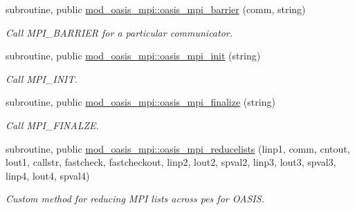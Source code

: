 \begin{DoxyCompactItemize}
subroutine, public \hyperlink{namespacemod__oasis__mpi_aaf477847380fbbbc1341520b0b3e66da}{mod\+\_\+oasis\+\_\+mpi\+::oasis\+\_\+mpi\+\_\+barrier} (comm, string)
\begin{DoxyCompactList}\small\item\em Call M\+P\+I\+\_\+\+B\+A\+R\+R\+I\+ER for a particular communicator. \end{DoxyCompactList}\item 
subroutine, public \hyperlink{namespacemod__oasis__mpi_aaf45f20e0000b32e71ec9ea8e806f57c}{mod\+\_\+oasis\+\_\+mpi\+::oasis\+\_\+mpi\+\_\+init} (string)
\begin{DoxyCompactList}\small\item\em Call M\+P\+I\+\_\+\+I\+N\+IT. \end{DoxyCompactList}\item 
subroutine, public \hyperlink{namespacemod__oasis__mpi_a0a601a3f718c0704db99a21b2c43fbcd}{mod\+\_\+oasis\+\_\+mpi\+::oasis\+\_\+mpi\+\_\+finalize} (string)
\begin{DoxyCompactList}\small\item\em Call M\+P\+I\+\_\+\+F\+I\+N\+A\+L\+ZE. \end{DoxyCompactList}\item 
subroutine, public \hyperlink{namespacemod__oasis__mpi_a95f6540150f7ab4e64697d2eabc2bf79}{mod\+\_\+oasis\+\_\+mpi\+::oasis\+\_\+mpi\+\_\+reducelists} (linp1, comm, cntout, lout1, callstr, fastcheck, fastcheckout, linp2, lout2, spval2, linp3, lout3, spval3, linp4, lout4, spval4)
\begin{DoxyCompactList}\small\item\em Custom method for reducing M\+PI lists across pes for O\+A\+S\+IS. \end{DoxyCompactList}\end{DoxyCompactItemize}
